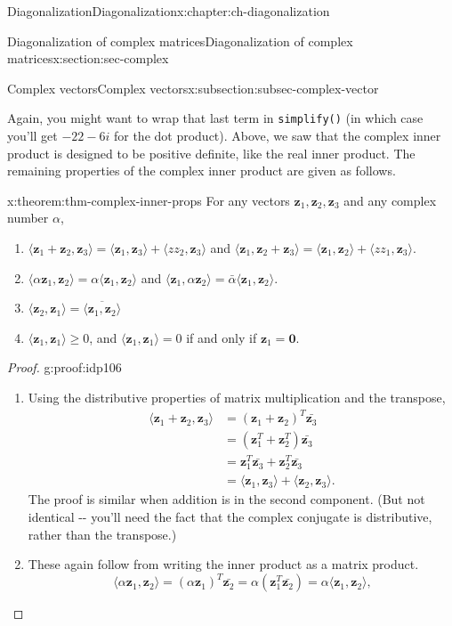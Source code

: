 \documentclass[oneside,10pt,]{book}
\newcommand{\mono}[1]{\texttt{#1}}
\numberwithin{equation}{section}
\newcommand{\zz}{\mathbf{z}}
\newcommand{\amp}{&}
\begin{document}
\begin{chapterptx}{Diagonalization}{}{Diagonalization}{}{}{x:chapter:ch-diagonalization}
\begin{sectionptx}{Diagonalization of complex matrices}{}{Diagonalization of complex matrices}{}{}{x:section:sec-complex}
\begin{subsectionptx}{Complex vectors}{}{Complex vectors}{}{}{x:subsection:subsec-complex-vector}
\begin{sageoutput}
\end{sageoutput}
Again, you might want to wrap that last term in \mono{simplify()} (in which case you'll get \(-22-6i\) for the dot product). Above, we saw that the complex inner product is designed to be positive definite, like the real inner product. The remaining properties of the complex inner product are given as follows.%
\begin{theorem}{}{}{x:theorem:thm-complex-inner-props}%
For any vectors \(\zz_1,\zz_2,\zz_3\) and any complex number \(\alpha\),%
\begin{enumerate}
\item{}\(\langle \zz_1+\zz_2,\zz_3\rangle = \langle \zz_1,\zz_3\rangle + \langle zz_2,\zz_3\rangle\) and \(\langle \zz_1,\zz_2+\zz_3\rangle = \langle \zz_1,\zz_2\rangle + \langle zz_1,\zz_3\rangle\).%
\item{}\(\langle \alpha\zz_1,\zz_2\rangle = \alpha\langle\zz_1,\zz_2\rangle\) and \(\langle \zz_1,\alpha\zz_2\rangle=\bar{\alpha}\langle \zz_1,\zz_2\rangle\).%
\item{}\(\displaystyle \langle \zz_2,\zz_1\rangle = \overline{\langle \zz_1,\zz_2\rangle}\)%
\item{}\(\langle \zz_1,\zz_1\rangle\geq 0\), and \(\langle \zz_1,\zz_1\rangle =0\) if and only if \(\zz_1=\mathbf{0}\).%
\end{enumerate}
%
\end{theorem}
\begin{proof}{}{g:proof:idp106}
%
\begin{enumerate}
\item{}Using the distributive properties of matrix multiplication and the transpose,%
\begin{align*}
\langle \zz_1+\zz_2,\zz_3\rangle \amp= (\zz_1+\zz_2)^T\bar{\zz_3}\\
\amp =(\zz_1^T+\zz_2^T)\bar{\zz_3}\\
\amp =\zz_1^T\bar{\zz_3}+\zz_2^T\bar{\zz_3}\\
\amp =\langle \zz_1,\zz_3\rangle + \langle \zz_2,\zz_3\rangle\text{.}
\end{align*}
The proof is similar when addition is in the second component. (But not identical -{}-{} you'll need the fact that the complex conjugate is distributive, rather than the transpose.)%
\item{}These again follow from writing the inner product as a matrix product.%
\begin{equation*}
\langle \alpha\zz_1,\zz_2\rangle = (\alpha \zz_1)^T\bar{\zz_2} = \alpha(\zz_1^T\bar{\zz_2}) = \alpha\langle\zz_1,\zz_2\rangle\text{,}

\end{equation*}
\end{enumerate}
\end{proof}
\end{subsectionptx}
\end{sectionptx}
\end{chapterptx}
\end{document}

